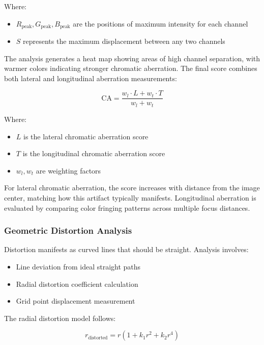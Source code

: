 Where:
\begin{itemize}
    \item \( R_{\text{peak}}, G_{\text{peak}}, B_{\text{peak}} \) are the positions of maximum intensity for each channel
    \item \( S \) represents the maximum displacement between any two channels
\end{itemize}

The analysis generates a heat map showing areas of high channel separation, with warmer colors indicating stronger chromatic aberration. The final score combines both lateral and longitudinal aberration measurements:

\begin{equation}
\text{CA} = \frac{w_l \cdot L + w_t \cdot T}{w_l + w_t}
\end{equation}

Where:
\begin{itemize}
    \item \( L \) is the lateral chromatic aberration score
    \item \( T \) is the longitudinal chromatic aberration score
    \item \( w_l, w_t \) are weighting factors
\end{itemize}

For lateral chromatic aberration, the score increases with distance from the image center, matching how this artifact typically manifests. Longitudinal aberration is evaluated by comparing color fringing patterns across multiple focus distances.

\subsubsection{Geometric Distortion Analysis}
Distortion manifests as curved lines that should be straight. Analysis involves:

\begin{itemize}
    \item Line deviation from ideal straight paths
    \item Radial distortion coefficient calculation
    \item Grid point displacement measurement
\end{itemize}

The radial distortion model follows:

\begin{equation}
r_{\text{distorted}} = r \left(1 + k_1 r^2 + k_2 r^4\right)
\end{equation}

